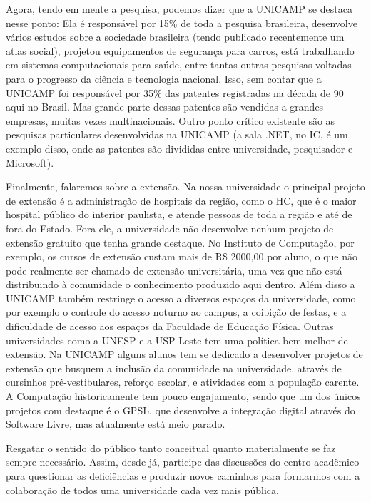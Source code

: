 Agora, tendo em mente a pesquisa, podemos dizer que a UNICAMP se destaca nesse
ponto: Ela é responsável por 15\% de toda a pesquisa brasileira, desenvolve
vários estudos sobre a sociedade brasileira (tendo publicado recentemente um
atlas social), projetou equipamentos de segurança para carros, está trabalhando
em sistemas computacionais para saúde, entre tantas outras pesquisas voltadas
para o progresso da ciência e tecnologia nacional. Isso, sem contar que
a UNICAMP foi responsável por 35\% das patentes registradas na década de 90 aqui
no Brasil. Mas grande parte dessas patentes são vendidas a grandes empresas,
muitas vezes multinacionais. Outro ponto crítico existente são as pesquisas
particulares desenvolvidas na UNICAMP (a sala .NET, no IC, é um exemplo disso,
onde as patentes são divididas entre universidade, pesquisador e Microsoft).

Finalmente, falaremos sobre a extensão. Na nossa universidade o principal
projeto de extensão é a administração de hospitais da região, como o HC, que
é o maior hospital público do interior paulista, e atende pessoas de toda
a região e até de fora do Estado. Fora ele, a universidade não desenvolve nenhum
projeto de extensão gratuito que tenha grande destaque. No Instituto de
Computação, por exemplo, os cursos de extensão custam mais de R\$ 2000,00 por
aluno, o que não pode realmente ser chamado de extensão universitária, uma vez
que não está distribuindo à comunidade o conhecimento produzido aqui dentro.
Além disso a UNICAMP também restringe o acesso a diversos espaços da
universidade, como por exemplo o controle do acesso noturno ao campus,
a coibição de festas, e a dificuldade de acesso aos espaços da Faculdade de
Educação Física. Outras universidades como a UNESP e a USP Leste tem uma
política bem melhor de extensão. Na UNICAMP alguns alunos tem se dedicado
a desenvolver projetos de extensão que busquem a inclusão da comunidade na
universidade, através de cursinhos pré-vestibulares, reforço escolar,
e atividades com a população carente. A Computação historicamente tem pouco
engajamento, sendo que um dos únicos projetos com destaque é o GPSL, que
desenvolve a integração digital através do Software Livre, mas atualmente está
meio parado.

Resgatar o sentido do público tanto conceitual quanto materialmente se faz
sempre necessário. Assim, desde já, participe das discussões do centro acadêmico
para questionar as deficiências e produzir novos caminhos para formarmos com
a colaboração de todos uma universidade cada vez mais pública.

